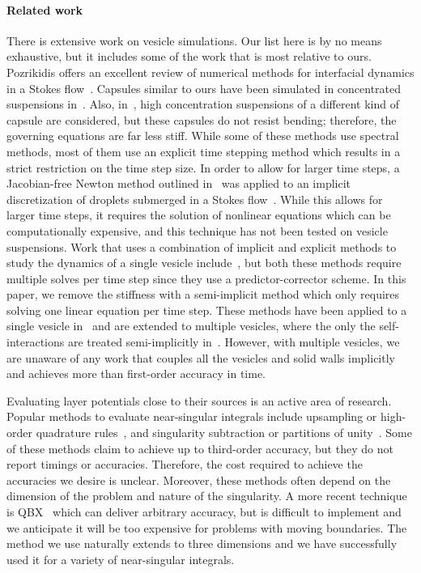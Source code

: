 \paragraph{Related work} 
There is extensive work on vesicle simulations.  Our list here is by no
means exhaustive, but it includes some of the work that is most relative
to ours.  Pozrikidis offers an excellent review of numerical methods for
interfacial dynamics in a Stokes flow~\cite{pozrikidis2001a}.  Capsules
similar to ours have been simulated in concentrated suspensions
in~\cite{li:poz2002,zha:sha:nar2012,zha:sha2011b,zha:isf:ols:fre2010,fre:zha2010,fre:ore2011}.
Also, in~\cite{pra:riv:gra2012,kum:riv:gra2014,kum:gra2011}, high
concentration suspensions of a different kind of capsule are considered,
but these capsules do not resist bending; therefore, the governing
equations are far less stiff.  While some of these methods use spectral
methods, most of them use an explicit time stepping method which results
in a strict restriction on the time step size.  In order to allow for
larger time steps, a Jacobian-free Newton method outlined
in~\cite{dim:hig1997} was applied to an implicit discretization of
droplets submerged in a Stokes flow~\cite{dim2007}.  While this allows
for larger time steps, it requires the solution of nonlinear equations
which can be computationally expensive, and this technique has not been
tested on vesicle suspensions.  Work that uses a combination of implicit
and explicit methods to study the dynamics of a single vesicle
include~\cite{zha:sha2013a,zha:sha2009}, but both these methods require
multiple solves per time step since they use a predictor-corrector
scheme.  In this paper, we remove the stiffness with a semi-implicit
method which only requires solving one linear equation per time step.
These methods have been applied to a single vesicle
in~\cite{zha:sha2009,sal:mik2012} and are extended to multiple vesicles,
where the only the self-interactions are treated semi-implicitly
in~\cite{rah:vee:bir,shravan,zha:sha2013b}.  However, with multiple
vesicles, we are unaware of any work that couples all the vesicles and
solid walls implicitly and  achieves more than first-order accuracy in
time.

Evaluating layer potentials close to their sources is an active area of
research.  Popular methods to evaluate near-singular integrals include
upsampling or high-order quadrature
rules~\cite{helsing-ojala08,kro1999}, and singularity subtraction or
partitions of unity~\cite{poz1999,fre:zha2010,zha:isf:ols:fre2010}.
Some of these methods claim to achieve up to third-order accuracy, but
they do not report timings or accuracies.  Therefore, the cost required
to achieve the accuracies we desire is unclear.  Moreover, these methods
often depend on the dimension of the problem and nature of the
singularity.  A more recent technique is QBX~\cite{klo:bar:gre:one2012}
which can deliver arbitrary accuracy, but is difficult to implement and
we anticipate it will be too expensive for problems with moving
boundaries.  The method we use naturally extends to three dimensions and
we have successfully used it for a variety of near-singular integrals.

